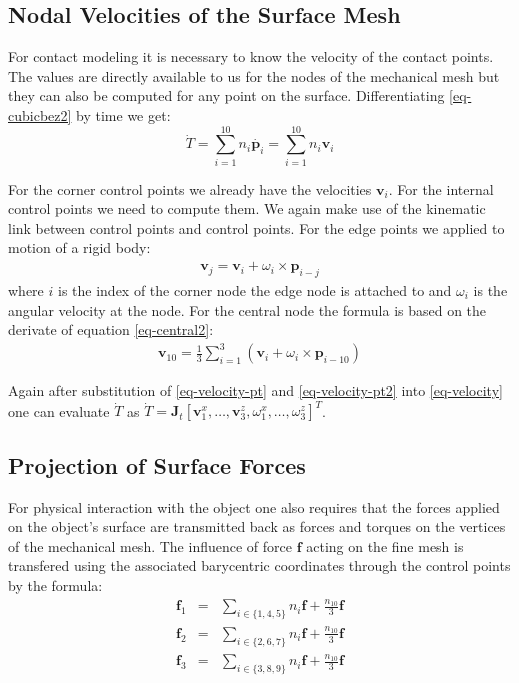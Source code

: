 \documentclass{egpubl}
\begin{document}
\subsection{Nodal Velocities of the Surface Mesh}

For contact modeling it is necessary to know the velocity of the contact points.
The values are directly available to us for the nodes of the mechanical mesh
but they can also be computed for any point on the surface.
Differentiating \eqref{eq-cubicbez2} by time we get:
%
\begin{equation}\label{eq-velocity}
    \dot{T} = \sum_{i=1}^{10} n_i \dot{\mathbf{p}_i} = \sum_{i=1}^{10} n_i \mathbf{v}_i
\end{equation}

For the corner control points  we
already have the velocities $\mathbf{v}_i$. For the internal control points  we need to compute
them. We again make use of the kinematic link between control points and control points.
For the edge points we applied to motion of a rigid body:
%
\begin{eqnarray}\label{eq-velocity-pt}
    \mathbf{v}_j = \mathbf{v}_i + \omega_i \times \mathbf{p}_{i-j}
\end{eqnarray}
%
where $i$ is the index of the corner node the edge node is attached to and
$\omega_i$ is the angular velocity at the node. For the central node
the formula is based on the derivate of equation \eqref{eq-central2}:
%
\begin{eqnarray}\label{eq-velocity-pt2}
    \mathbf{v}_{10} = \frac{1}{3} \sum_{i=1}^3 \left( \mathbf{v}_i + \omega_i \times \mathbf{p}_{i-10} \right)
\end{eqnarray}

Again after substitution of \eqref{eq-velocity-pt} and \eqref{eq-velocity-pt2} into
\eqref{eq-velocity} one can evaluate $\dot{T}$ as
%
$%
\dot{T} = \mathbf{J}_t \left[ \mathbf{v}^x_1, \hdots, \mathbf{v}^z_3,
        \omega^x_1, \ldots, \omega^z_3 \right]^T
$.%


\subsection{Projection of Surface Forces}

For physical interaction with the object one also requires that the
forces applied on the object's surface are transmitted back as forces
and torques on the vertices of the mechanical mesh.
The influence of force $\mathbf{f}$ acting on the fine mesh is transfered using the
associated barycentric coordinates through the control points by the formula:
%
\begin{eqnarray}
    \mathbf{f}_1 & = &  \sum_{i \in \{1,4,5\}} n_i \mathbf{f} + \frac{n_{10}}{3} \mathbf{f} \\
    \mathbf{f}_2 & = &  \sum_{i \in \{2,6,7\}} n_i \mathbf{f} + \frac{n_{10}}{3} \mathbf{f} \\
    \mathbf{f}_3 & = &  \sum_{i \in \{3,8,9\}} n_i \mathbf{f} + \frac{n_{10}}{3} \mathbf{f} 
\end{eqnarray}
\end{document}

